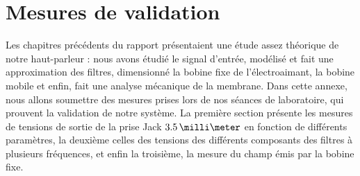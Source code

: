\chapter{Mesures de validation}

Les chapitres précédents du rapport présentaient une étude assez théorique de notre haut-parleur : nous avons étudié le signal d'entrée, modélisé et fait une approximation des filtres, dimensionné la bobine fixe de l'électroaimant, la bobine mobile et enfin, fait une analyse mécanique de la membrane.
Dans cette annexe, nous allons soumettre des mesures prises lors de nos séances de laboratoire, qui prouvent la validation de notre système.
La première section présente les mesures de tensions de sortie de la prise Jack $3.5\,\milli\meter$ en fonction de différents paramètres, la deuxième celles des tensions des différents composants des filtres à plusieurs fréquences, et enfin la troisième, la mesure du champ émis par la bobine fixe.




